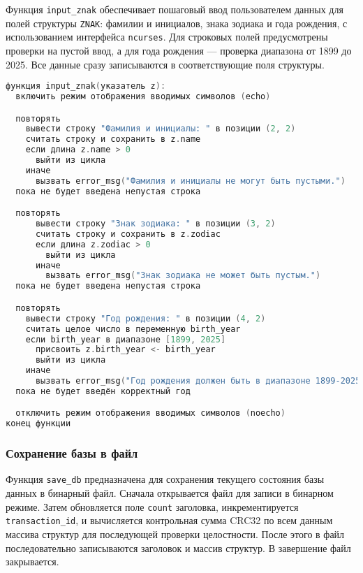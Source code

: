 Функция \texttt{input\_znak} обеспечивает пошаговый ввод пользователем данных для полей структуры \texttt{ZNAK}: фамилии и инициалов, знака зодиака и года рождения, с использованием интерфейса \texttt{ncurses}. Для строковых полей предусмотрены проверки на пустой ввод, а для года рождения — проверка диапазона от 1899 до 2025. Все данные сразу записываются в соответствующие поля структуры.

\begin{lstlisting}[language=C, caption=Функция input\_znak]
функция input_znak(указатель z):
  включить режим отображения вводимых символов (echo)

  повторять
    вывести строку "Фамилия и инициалы: " в позиции (2, 2)
    считать строку и сохранить в z.name
    если длина z.name > 0
      выйти из цикла
    иначе
      вызвать error_msg("Фамилия и инициалы не могут быть пустыми.")
  пока не будет введена непустая строка

  повторять
      вывести строку "Знак зодиака: " в позиции (3, 2)
      считать строку и сохранить в z.zodiac
      если длина z.zodiac > 0
        выйти из цикла
      иначе
        вызвать error_msg("Знак зодиака не может быть пустым.")
  пока не будет введена непустая строка

  повторять
    вывести строку "Год рождения: " в позиции (4, 2)
    считать целое число в переменную birth_year
    если birth_year в диапазоне [1899, 2025]
      присвоить z.birth_year <- birth_year
      выйти из цикла
    иначе
      вызвать error_msg("Год рождения должен быть в диапазоне 1899-2025.")
  пока не будет введён корректный год

  отключить режим отображения вводимых символов (noecho)
конец функции

\end{lstlisting}

\subsubsection*{Сохранение базы в файл}

Функция \texttt{save\_db} предназначена для сохранения текущего состояния базы данных в бинарный файл. Сначала открывается файл для записи в бинарном режиме. Затем обновляется поле \texttt{count} заголовка, инкрементируется \texttt{transaction\_id}, и вычисляется контрольная сумма CRC32 по всем данным массива структур для последующей проверки целостности. После этого в файл последовательно записываются заголовок и массив структур. В завершение файл закрывается.

